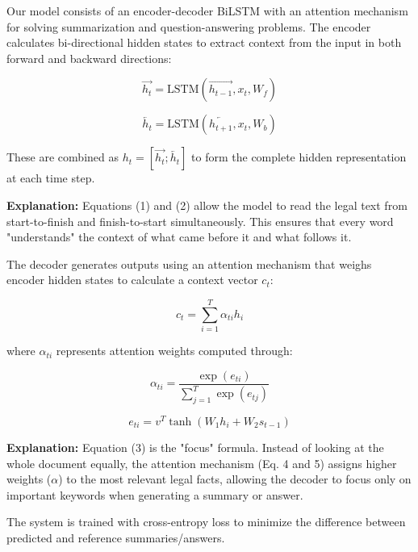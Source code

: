 \documentclass{llncs}
\begin{document}
Our model consists of an encoder-decoder BiLSTM with an attention mechanism for solving summarization and question-answering problems. The encoder calculates bi-directional hidden states to extract context from the input in both forward and backward directions:

\begin{equation}
\overrightarrow{h_t} = \text{LSTM}(\overrightarrow{h_{t-1}}, x_t, W_f)
\end{equation}

\begin{equation}
\overleftarrow{h_t} = \text{LSTM}(\overleftarrow{h_{t+1}}, x_t, W_b)
\end{equation}

These are combined as $h_t = [\overrightarrow{h_t}; \overleftarrow{h_t}]$ to form the complete hidden representation at each time step. 

\textbf{Explanation:} Equations (1) and (2) allow the model to read the legal text from start-to-finish and finish-to-start simultaneously. This ensures that every word "understands" the context of what came before it and what follows it.

The decoder generates outputs using an attention mechanism that weighs encoder hidden states to calculate a context vector $c_t$:

\begin{equation}
c_t = \sum_{i=1}^{T} \alpha_{ti} h_i
\end{equation}

where $\alpha_{ti}$ represents attention weights computed through:

\begin{equation}
\alpha_{ti} = \frac{\exp(e_{ti})}{\sum_{j=1}^{T} \exp(e_{tj})}
\end{equation}

\begin{equation}
e_{ti} = v^T \tanh(W_1 h_i + W_2 s_{t-1})
\end{equation}

\textbf{Explanation:} Equation (3) is the "focus" formula. Instead of looking at the whole document equally, the attention mechanism (Eq. 4 and 5) assigns higher weights ($\alpha$) to the most relevant legal facts, allowing the decoder to focus only on important keywords when generating a summary or answer.

The system is trained with cross-entropy loss to minimize the difference between predicted and reference summaries/answers.
\end{document}
